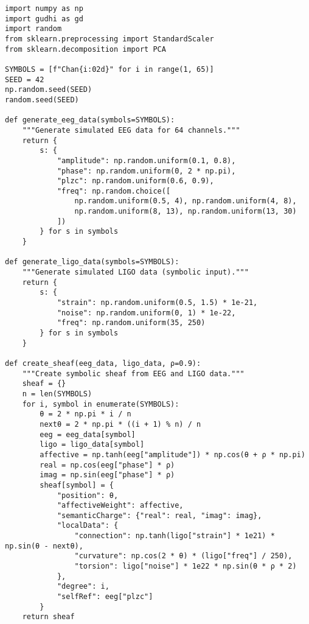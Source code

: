 \documentclass[11pt]{article}
\begin{document}
\begin{lstlisting}
import numpy as np
import gudhi as gd
import random
from sklearn.preprocessing import StandardScaler
from sklearn.decomposition import PCA

SYMBOLS = [f"Chan{i:02d}" for i in range(1, 65)]
SEED = 42
np.random.seed(SEED)
random.seed(SEED)

def generate_eeg_data(symbols=SYMBOLS):
    """Generate simulated EEG data for 64 channels."""
    return {
        s: {
            "amplitude": np.random.uniform(0.1, 0.8),
            "phase": np.random.uniform(0, 2 * np.pi),
            "plzc": np.random.uniform(0.6, 0.9),
            "freq": np.random.choice([
                np.random.uniform(0.5, 4), np.random.uniform(4, 8),
                np.random.uniform(8, 13), np.random.uniform(13, 30)
            ])
        } for s in symbols
    }

def generate_ligo_data(symbols=SYMBOLS):
    """Generate simulated LIGO data (symbolic input)."""
    return {
        s: {
            "strain": np.random.uniform(0.5, 1.5) * 1e-21,
            "noise": np.random.uniform(0, 1) * 1e-22,
            "freq": np.random.uniform(35, 250)
        } for s in symbols
    }

def create_sheaf(eeg_data, ligo_data, ρ=0.9):
    """Create symbolic sheaf from EEG and LIGO data."""
    sheaf = {}
    n = len(SYMBOLS)
    for i, symbol in enumerate(SYMBOLS):
        θ = 2 * np.pi * i / n
        nextθ = 2 * np.pi * ((i + 1) % n) / n
        eeg = eeg_data[symbol]
        ligo = ligo_data[symbol]
        affective = np.tanh(eeg["amplitude"]) * np.cos(θ + ρ * np.pi)
        real = np.cos(eeg["phase"] * ρ)
        imag = np.sin(eeg["phase"] * ρ)
        sheaf[symbol] = {
            "position": θ,
            "affectiveWeight": affective,
            "semanticCharge": {"real": real, "imag": imag},
            "localData": {
                "connection": np.tanh(ligo["strain"] * 1e21) * np.sin(θ - nextθ),
                "curvature": np.cos(2 * θ) * (ligo["freq"] / 250),
                "torsion": ligo["noise"] * 1e22 * np.sin(θ * ρ * 2)
            },
            "degree": i,
            "selfRef": eeg["plzc"]
        }
    return sheaf


\end{lstlisting}
\end{document}
